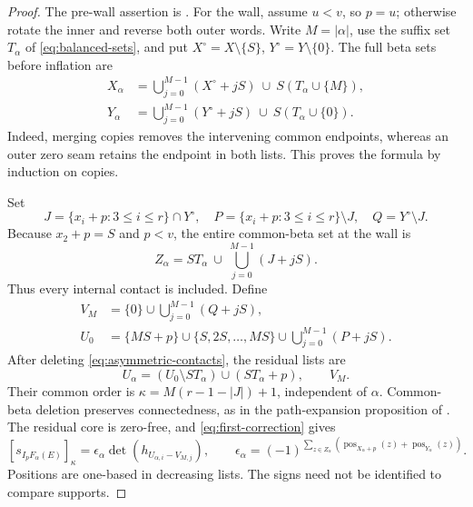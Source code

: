 \documentclass[11pt,a4paper]{amsart}
\numberwithin{equation}{section}
\theoremstyle{plain}
\theoremstyle{definition}
\begin{document}
\begin{proof}
The pre-wall assertion is .  For the wall, assume
\(u<v\), so \(p=u\); otherwise rotate the inner and reverse both
outer words.  Write \(M=|\alpha|\), use the suffix set
\(T_\alpha\) of \eqref{eq:balanced-sets}, and put
\(X^\circ=X\setminus\{S\}\), \(Y^\circ=Y\setminus\{0\}\).
The full beta sets before inflation are
\begin{equation}\label{eq:full-repeated-betas}
 \begin{aligned}
 X_\alpha&=\bigcup_{j=0}^{M-1}(X^\circ+jS)
                   \ \cup\ S(T_\alpha\cup\{M\}),\\
 Y_\alpha&=\bigcup_{j=0}^{M-1}(Y^\circ+jS)
                   \ \cup\ S(T_\alpha\cup\{0\}).
 \end{aligned}
\end{equation}
Indeed, merging copies removes the intervening common endpoints, whereas
an outer zero seam retains the endpoint in both lists.  This proves the
formula by induction on copies.

Set
\[
 J=\{x_i+p:3\le i\le r\}\cap Y^\circ,\quad
 P=\{x_i+p:3\le i\le r\}\setminus J,\quad
 Q=Y^\circ\setminus J.
\]
Because \(x_2+p=S\) and \(p<v\), the entire common-beta set
at the wall is
\begin{equation}\label{eq:asymmetric-contacts}
 Z_\alpha=ST_\alpha\ \cup\ \bigcup_{j=0}^{M-1}(J+jS).
\end{equation}
Thus every internal contact is included.  Define
\[
 \begin{split}
 V_M&=\{0\}\cup\bigcup_{j=0}^{M-1}(Q+jS),\\
 U_0&=\{MS+p\}\cup\{S,2S,\ldots,MS\}
                 \cup\bigcup_{j=0}^{M-1}(P+jS).
 \end{split}
\]
After deleting \eqref{eq:asymmetric-contacts}, the residual lists are
\begin{equation}\label{eq:asymmetric-core}
 U_\alpha=(U_0\setminus ST_\alpha)\cup(ST_\alpha+p),
 \qquad V_M.
\end{equation}
Their common order is \(\kappa=M(r-1-|J|)+1\), independent
of \(\alpha\).  Common-beta deletion preserves connectedness,
as in the path-expansion proposition of \cite{Shields2026Cofactor}.
The residual core is zero-free, and \eqref{eq:first-correction} gives
\[
 [s_{I_pF_\alpha(E)}]_\kappa
   =\epsilon_\alpha\det(h_{U_{\alpha,i}-V_{M,j}}),\qquad
 \epsilon_\alpha=(-1)^{\sum_{z\in Z_\alpha}
  (\operatorname{pos}_{X_\alpha+p}(z)+\operatorname{pos}_{Y_\alpha}(z))}.
\]
Positions are one-based in decreasing lists.  The signs need not be
identified to compare supports.


\end{proof}
\end{document}
